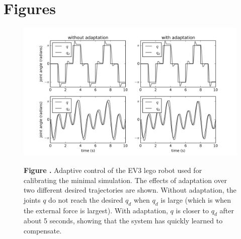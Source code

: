 \documentclass{frontiersSCNS} %
\begin{document}
\section*{Figures}


\begin{figure}[h!]
\begin{center}
\includegraphics[width=18cm]{figures/fig_ev3}
\end{center}
 \textbf{\label{fig:ev3} Figure .}{ Adaptive control of the EV3 lego robot used for calibrating the minimal simulation.
 The effects of adaptation over two different desired trajectories are shown.  Without adaptation, the joints $q$ do not reach the desired $q_d$ when $q_d$ is large (which
 is when the external force is largest).  With adaptation, $q$ is closer to $q_d$ after about 5 seconds, showing that the system has quickly learned to compensate.}
\end{figure}




\end{document}
